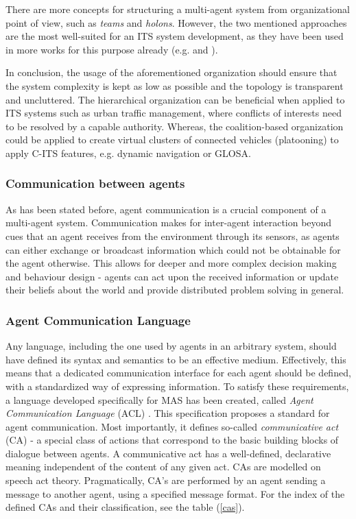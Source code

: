 \documentclass[main.tex]{subfiles}
\begin{document}
There are more concepts for structuring a multi-agent system from organizational point of view, 
such as \emph{teams} and \emph{holons}. However, the two mentioned approaches are the most well-suited for 
an ITS system development, as they have been used in more works for this purpose already 
(e.g. \cite{Balaji2007} and \cite{Vijsel2004}). 

In conclusion, the usage of the aforementioned organization should ensure that the system complexity 
is kept as low as possible and the topology is transparent and uncluttered. The hierarchical 
organization can be beneficial when applied to ITS systems such as urban traffic management, where 
conflicts of interests need to be resolved by a capable authority. Whereas, the coalition-based 
organization could be applied to create virtual clusters of connected vehicles (platooning) to apply 
C-ITS features, e.g. dynamic navigation or GLOSA.

\subsubsection{Communication between agents}

As has been stated before, agent communication is a crucial component of a multi-agent system. 
Communication makes for inter-agent interaction beyond cues that an agent receives from the environment 
through its sensors, as agents can either exchange or broadcast information which could not be obtainable 
for the agent otherwise. This allows for deeper and more complex decision making and behaviour design - 
agents can act upon the received information or update their beliefs about the world and provide 
distributed problem solving in general. 

\subsubsection{Agent Communication Language}\label{sec-acl}

Any language, including the one used by agents in an arbitrary system, should have defined its syntax and 
semantics to be an effective medium. Effectively, this means that a dedicated communication
interface for each agent should be defined, with a standardized way of expressing information. 
To satisfy these requirements, a language developed specifically for MAS has been created, 
called \emph{Agent Communication Language} (ACL) \cite{IntelligentPhysicalAgents2001}. 
This specification proposes a standard for agent communication. Most importantly, it defines 
so-called \emph{communicative act} (CA) - a special class of actions that correspond to the basic
building blocks of dialogue between agents. A communicative act has a well-defined, declarative
meaning independent of the content of any given act. CAs are modelled on speech act theory.
Pragmatically, CA's are performed by an agent sending a message to another agent, using a
specified message format. For the index of the defined CAs and their classification, see the
table (\ref{cas}).
\end{document}
